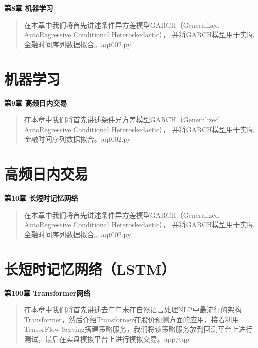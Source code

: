 \documentclass{article}
\begin{document}
\maketitle\begin{center}
\Large \textbf{第8章 机器学习}
\end{center}
\begin{abstract}
在本章中我们将首先讲述条件异方差模型GARCH（Generalized AutoRegressive Conditional Heteroskedastic），
并将GARCH模型用于实际金融时间序列数据拟合。aqt002.py
\end{abstract}
\section{机器学习}

\maketitle\begin{center}
\Large \textbf{第9章 高频日内交易}
\end{center}
\begin{abstract}
在本章中我们将首先讲述条件异方差模型GARCH（Generalized AutoRegressive Conditional Heteroskedastic），
并将GARCH模型用于实际金融时间序列数据拟合。aqt002.py
\end{abstract}
\section{高频日内交易}

\maketitle\begin{center}
\Large \textbf{第10章 长短时记忆网络}
\end{center}
\begin{abstract}
在本章中我们将首先讲述条件异方差模型GARCH（Generalized AutoRegressive Conditional Heteroskedastic），
并将GARCH模型用于实际金融时间序列数据拟合。aqt002.py
\end{abstract}
\section{长短时记忆网络（LSTM）}

\maketitle\begin{center}
\Large \textbf{第100章 \quad Transformer网络}
\end{center}
\begin{abstract}
在本章中我们将首先讲述去年年未在自然语言处理NLP中最流行的架构Transformer，然后介绍Transformer在股价预测方面的应用，接着利用TensorFlow Serving搭建策略服务，我们将该策略服务放到回测平台上进行测试，最后在实盘模拟平台上进行模拟交易。app/tqp
\end{abstract}
\end{document}
